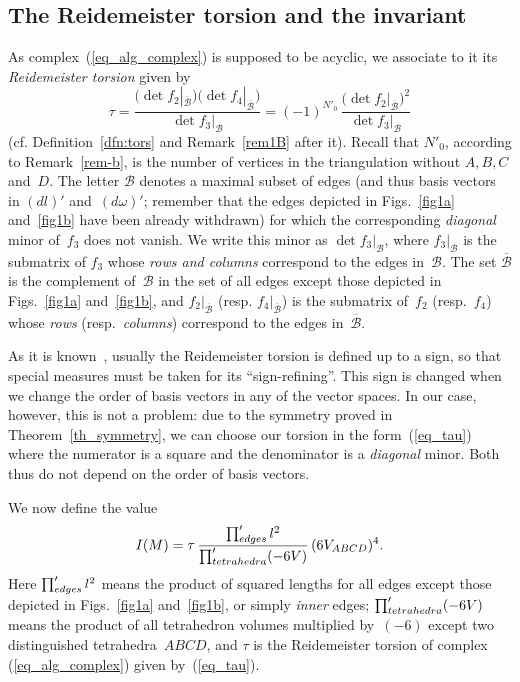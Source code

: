 \documentclass[11pt]{article}
\begin{document}
\subsection{The Reidemeister torsion and the invariant}
\label{subsec-torsion-invariant}

As complex~(\ref{eq_alg_complex}) is supposed to be acyclic, we associate to it its \emph{Reidemeister torsion} given by
\begin{equation}
\tau = \frac{\bigl(\det f_2 |_{\overline{\mathcal B}}\bigr) \bigl(\det f_4 |_{\overline{\mathcal B}}\bigr)}{\det f_3 |_{\mathcal B}} = (-1)^{N'_0}\, \frac{\bigl(\det f_2 |_{\overline{\mathcal B}}\bigr)^2}{\det f_3 |_{\mathcal B}}
\label{eq_tau}
\end{equation}
(cf. Def\/inition~\ref{dfn:tors} and Remark~\ref{rem1B} after it). Recall that $N'_0$, according to Remark~\ref{rem-b}, is the number of vertices in the triangulation without $A,B,C$ and~$D$. The letter $\mathcal B$ denotes a maximal subset of edges (and thus basis vectors in $(dl)'$ and~$(d\omega)'$; remember that the edges depicted in Figs.~\ref{fig1a} and~\ref{fig1b} have been already withdrawn) for which the corresponding \emph{ diagonal} minor of~$f_3$ does not vanish. We write this minor as $\det f_3|_{\mathcal B}$, where $f_3|_{\mathcal B}$ is the submatrix of $f_3$ whose \emph{rows and columns} correspond to the edges in~$\mathcal B$. The set $\overline{\mathcal B}$ is the complement of~$\mathcal B$ in the set of all edges except those depicted in Figs.~\ref{fig1a} and~\ref{fig1b}, and $f_2|_{\overline{\mathcal B}}$ (resp. $f_4|_{\overline{\mathcal B}}$) is the submatrix of~$f_2$ (resp.~$f_4$) whose \emph{rows} (resp.\ \emph{columns}) correspond to the edges in~$\overline{\mathcal B}$.

\begin{remark}
\label{remark_sign}
As it is known~\cite{Turaev:2001}, usually the Reidemeister torsion is def\/ined up to a sign, so that special measures must be taken for its ``sign-ref\/ining''. This sign is changed when we change the order of basis vectors in any of the vector spaces. In our case, however, this is not a problem: due to the symmetry proved in Theorem~\ref{th_symmetry}, we can choose our torsion in the form~(\ref{eq_tau}) where the numerator is a square and the denominator is a \emph{diagonal} minor. Both thus do not depend on the order of basis vectors.
\end{remark}

We now def\/ine the value
\begin{equation}
I(M) = \tau\, \frac{\prod_{\rm edges}' l^2}{\prod_{\rm tetrahedra}' (-6V)}\, (6V_{ABCD})^4.
\label{eq_invariant}
\end{equation}
Here $\prod_{\rm edges}' l^2$ means the product of squared lengths for all edges except those depicted in Figs.~\ref{fig1a} and~\ref{fig1b}, or simply \emph{inner} edges; $\prod_{\rm tetrahedra}' (-6V)$ means the product of all tetrahedron volumes multiplied by~$(-6)$ except two distinguished tetrahedra~$ABCD$, and $\tau$ is the Reidemeister torsion of complex (\ref{eq_alg_complex}) given by~(\ref{eq_tau}).
\end{document}
